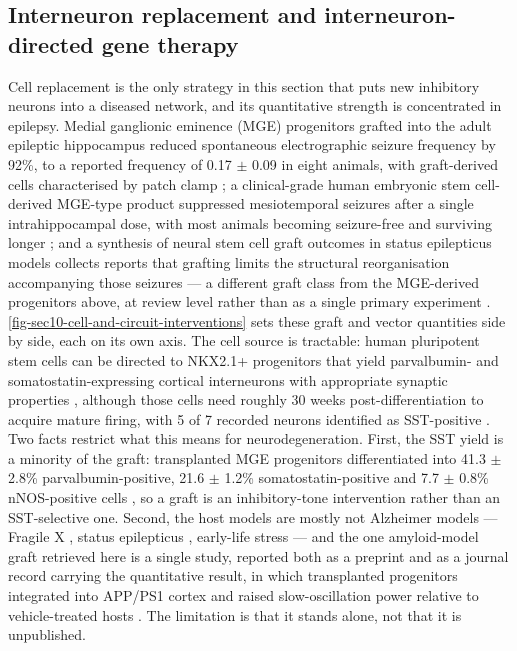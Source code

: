 \documentclass[11pt]{article}
\begin{document}
\subsection{Interneuron replacement and interneuron-directed gene therapy}
\label{sec-10-replacement}

Cell replacement is the only strategy in this section that puts new inhibitory neurons into a diseased network, and its quantitative strength is concentrated in epilepsy. Medial ganglionic eminence (MGE) progenitors grafted into the adult epileptic hippocampus reduced spontaneous electrographic seizure frequency by 92\%, to a reported frequency of 0.17 $\pm$ 0.09 in eight animals, with graft-derived cells characterised by patch clamp \citep{Hunt2013}; a clinical-grade human embryonic stem cell-derived MGE-type product suppressed mesiotemporal seizures after a single intrahippocampal dose, with most animals becoming seizure-free and surviving longer \citep{Bershteyn2023}; and a synthesis of neural stem cell graft outcomes in status epilepticus models collects reports that grafting limits the structural reorganisation accompanying those seizures --- a different graft class from the MGE-derived progenitors above, at review level rather than as a single primary experiment \citep{Wang2025c}. \ref{fig-sec10-cell-and-circuit-interventions} sets these graft and vector quantities side by side, each on its own axis. The cell source is tractable: human pluripotent stem cells can be directed to NKX2.1+ progenitors that yield parvalbumin- and somatostatin-expressing cortical interneurons with appropriate synaptic properties \citep{Maroof2013}, although those cells need roughly 30 weeks post-differentiation to acquire mature firing, with 5 of 7 recorded neurons identified as SST-positive \citep{Nicholas2013}. Two facts restrict what this means for neurodegeneration. First, the SST yield is a minority of the graft: transplanted MGE progenitors differentiated into 41.3 $\pm$ 2.8\% parvalbumin-positive, 21.6 $\pm$ 1.2\% somatostatin-positive and 7.7 $\pm$ 0.8\% nNOS-positive cells \citep{Wang2025a}, so a graft is an inhibitory-tone intervention rather than an SST-selective one. Second, the host models are mostly not Alzheimer models --- Fragile X \citep{Wang2025a}, status epilepticus \citep{Wang2025c}, early-life stress \citep{Lin2025} --- and the one amyloid-model graft retrieved here is a single study, reported both as a preprint \citep{Yokomizo2025b} and as a journal record carrying the quantitative result, in which transplanted progenitors integrated into APP/PS1 cortex and raised slow-oscillation power relative to vehicle-treated hosts \citep{Yokomizo2025a}. The limitation is that it stands alone, not that it is unpublished.
\end{document}
